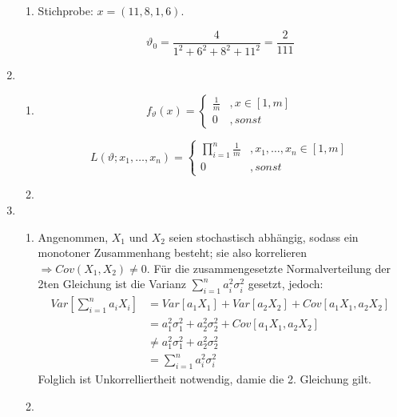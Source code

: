 \documentclass[a4paper]{scrartcl}
\def \blattnr {7}
\begin{document}
\begin{enumerate}[label=\bfseries \blattnr.\arabic*]
\begin{enumerate}
\item 
Stichprobe: $x = (11,8,1,6)$.
  
\begin{equation*}
\vartheta_0 = \frac{4}{1^2 + 6^2 + 8^2 + 11^2} = \frac2{111} 
\end{equation*}

\end{enumerate}

\item 
\begin{enumerate}
\item 

\begin{equation*}
 f_\vartheta(x) = \begin{cases}
		    \frac1m &, x \in [1,m] \\
		    0 &, sonst
                  \end{cases}
\end{equation*}

\begin{equation*}
 L(\vartheta;x_1,\ldots,x_n) = \begin{cases}
		    \prod_{i=1}^n\frac1m &, x_1,\ldots,x_n \in [1,m] \\
		    0 &, sonst
                  \end{cases}
\end{equation*}
 


\item 
\end{enumerate}

\item 
\begin{enumerate}
\item 

Angenommen, $X_1$ und $X_2$ seien stochastisch abhängig, sodass ein monotoner Zusammenhang besteht; sie also korrelieren  $\Rightarrow Cov(X_1,X_2)\neq 0$.
Für die zusammengesetzte Normalverteilung der 2ten Gleichung ist die  Varianz $\sum_{i=1}^n a_i^2\sigma_i^2$ gesetzt, jedoch:
\begin{equation*}
  \begin{split}
 Var\left[ \sum_{i=1}^n a_iX_i \right] 
 &= Var[a_1X_1] + Var[a_2X_2] + Cov[a_1X_1,a_2X_2] \\
 &= a_1^2\sigma_1^2 + a_2^2\sigma_2^2 + Cov[a_1X_1,a_2X_2] \\
 &\neq a_1^2\sigma_1^2 + a_2^2\sigma_2^2 \\
 &= \sum_{i=1}^n a_i^2\sigma_i^2
 \end{split}
\end{equation*}
Folglich ist Unkorrelliertheit notwendig, damie die 2. Gleichung gilt.

\item 
\end{enumerate}

\end{enumerate}
\end{document}

